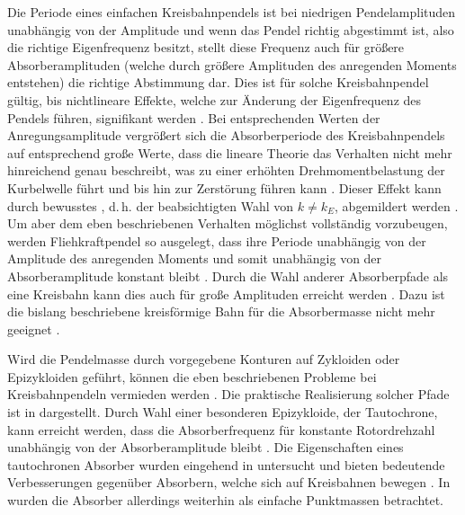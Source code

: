 Die Periode eines einfachen Kreisbahnpendels ist bei niedrigen Pendelamplituden unabhängig von der Amplitude 
und wenn das Pendel richtig abgestimmt ist, also die richtige Eigenfrequenz besitzt, 
stellt diese Frequenz auch für größere Absorberamplituden (welche durch
größere Amplituden des anregenden Moments entstehen) die richtige Abstimmung dar.
Dies ist für solche Kreisbahnpendel gültig, bis nichtlineare Effekte, welche zur Änderung der Eigenfrequenz des Pendels führen,
signifikant werden \cite{Denman:Tautochronic, Haddow:2003:ExperimentalInv}.
Bei entsprechenden Werten der Anregungsamplitude vergrößert sich die Absorberperiode
des Kreisbahnpendels auf entsprechend große Werte, dass die lineare Theorie das Verhalten nicht mehr hinreichend
genau beschreibt, was zu einer erhöhten Drehmomentbelastung der Kurbelwelle führt
und bis hin zur Zerstörung führen kann \cite{Denman:Tautochronic}.
Dieser Effekt kann durch bewusstes , 
d.\,h. der beabsichtigten Wahl von  $k \neq k_E$, abgemildert werden  \cite{ALSUWAIYAN:2002:PerformanceAnd}.
Um aber dem eben beschriebenen Verhalten möglichst vollständig vorzubeugen, werden Fliehkraftpendel so 
ausgelegt, dass ihre Periode unabhängig von der Amplitude des anregenden Moments und somit
unabhängig von der Absorberamplitude konstant bleibt \cite{Denman:Tautochronic}.
Durch die Wahl anderer Absorberpfade als eine Kreisbahn kann dies  auch für große 
Amplituden erreicht werden \cite{ALSUWAIYAN:2002:PerformanceAnd}. 
Dazu ist die bislang beschriebene kreisförmige Bahn für die Absorbermasse nicht mehr geeignet  \cite{Denman:Tautochronic}.

Wird die Pendelmasse durch vorgegebene Konturen auf Zykloiden oder Epizykloiden geführt,
können die eben beschriebenen Probleme bei Kreisbahnpendeln vermieden werden 
\cite{Denman:Tautochronic, Lee:TorsionalVibRed}. 
Die praktische Realisierung solcher Pfade ist in 
\cite{Denman:Tautochronic, Mayet:Experimental} dargestellt.
Durch Wahl einer besonderen Epizykloide, der Tautochrone, kann erreicht werden, 
dass die Absorberfrequenz für konstante Rotordrehzahl unabhängig von der Absorberamplitude 
bleibt \cite{Denman:Tautochronic}.
Die Eigenschaften eines tautochronen Absorber wurden eingehend in \cite{Denman:Tautochronic}
untersucht und bieten bedeutende Verbesserungen gegenüber Absorbern, welche sich
auf Kreisbahnen bewegen \cite{Denman:Tautochronic, LeeShaw:OnTheCounteraction}.
In \cite{Denman:Tautochronic} wurden die Absorber allerdings weiterhin als einfache
Punktmassen betrachtet.



